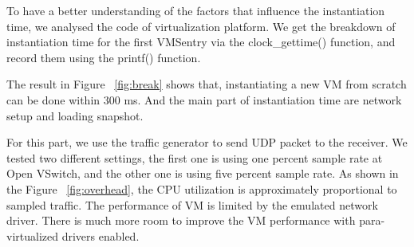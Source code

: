 To have a better understanding of the factors that influence the instantiation time, we analysed the code of virtualization platform. We get the breakdown of instantiation time for the first VMSentry via the clock\_gettime() function, and record them using the printf() function.

The result in Figure ~\ref{fig:break} shows that, instantiating a new VM from scratch can be done within 300 ms. And the main part of instantiation time are network setup and loading snapshot. 


For this part, we use the traffic generator to send UDP packet to the receiver. We tested two different settings, the first one is using one percent sample rate at Open VSwitch, and the other one is using five percent sample rate. As shown in the Figure ~\ref{fig:overhead}, the CPU utilization is approximately proportional to sampled traffic. The performance of VM is limited by the emulated network driver. There is much more room to improve the VM performance with para-virtualized drivers enabled.







